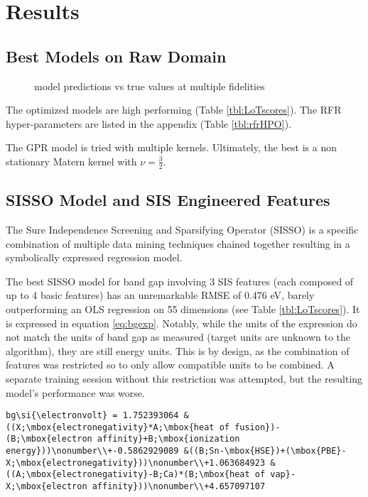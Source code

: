 \section{Results}
\label{sec:orgc80d43f}
\subsection{Best Models on Raw Domain}
\label{sec:org4fae772}
 
\begin{figure}[htbp]
\centering

\caption{\label{fig:pairplots} model predictions vs true values at multiple fidelities}
\end{figure}

The optimized models are high performing (Table \ref{tbl:LoTscores}).
The RFR hyper-parameters are listed in the appendix (Table \ref{tbl:rfrHPO}).

The GPR model is tried with multiple kernels.
Ultimately, the best is a non stationary Matern kernel with \(\nu = \frac{3}{2}\).

\subsection{SISSO Model and SIS Engineered Features}
\label{sec:orgf82f325}
The Sure Independence Screening and Sparsifying Operator (SISSO) is a specific combination of multiple data mining techniques chained together resulting in a symbolically expressed regression model.
\autocite{ouyang-2018-sisso,ghiringhelli-2017-learn-physic} 

The best SISSO model for band gap involving 3 SIS features (each composed of up to 4 basic features) has an unremarkable RMSE of 0.476 eV, barely outperforming an OLS regression on 55 dimensions (see Table \ref{tbl:LoTscores}).
It is expressed in equation \ref{eq:bgexp}.
Notably, while the units of the expression do not match the units of band gap as measured (target units are unknown to the algorithm), they are still energy units.
This is by design, as the combination of features was restricted so to only allow compatible units to be combined.
A separate training session without this restriction was attempted, but the resulting model's performance was worse.

\begin{verbatim}
bg\si{\electronvolt} = 1.752393064 &((X;\mbox{electronegativity}*A;\mbox{heat of fusion})-(B;\mbox{electron affinity}+B;\mbox{ionization energy}))\nonumber\\+-0.5862929089 &((B;Sn-\mbox{HSE})+(\mbox{PBE}-X;\mbox{electronegativity}))\nonumber\\+1.063684923 &((A;\mbox{electronegativity}-B;Ca)*(B;\mbox{heat of vap}-X;\mbox{electron affinity}))\nonumber\\+4.657097107
\end{verbatim}


